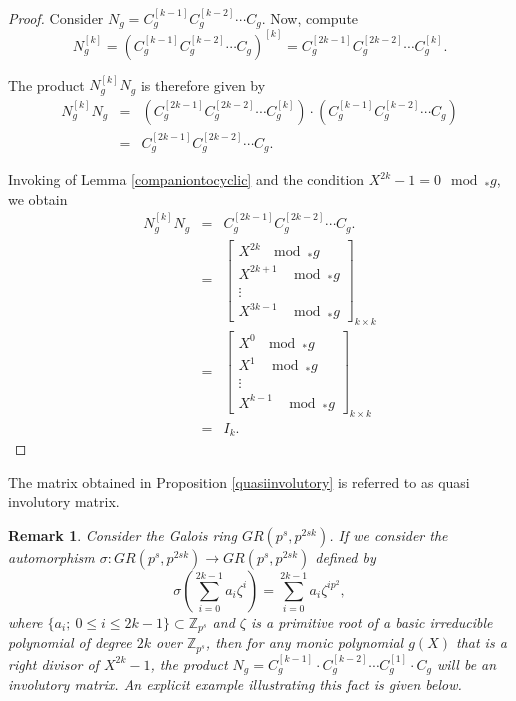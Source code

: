 \documentclass[11pt]{article}
\newtheorem{remark}{Remark}
\begin{document}
 
  \begin{proof} 
  	Consider $N_g = C_g^{[k-1]} C_g^{[k-2]} \cdots C_g$. Now, compute \[ N_g^{[k]} = (C_g^{[k-1]} C_g^{[k-2]} \cdots C_g)^{[k]} = C_g^{[2k-1]} C_g^{[2k-2]} \cdots C_g^{[k]}. \] 
    
    The product $N_g^{[k]}N_g$ is therefore given by 
    \begin{eqnarray*}
          N_g^{[k]}N_g &=& (C_g^{[2k-1]} C_g^{[2k-2]} \cdots C_g^{[k]}) \cdot (C_g^{[k-1]} C_g^{[k-2]} \cdots C_g)\\
          &=& C_g^{[2k-1]} C_g^{[2k-2]}   \cdots C_g. 
    \end{eqnarray*}
    
    Invoking of Lemma \ref{companiontocyclic} and the condition $X^{2k}-1=0 \mod_\ast g$, we obtain
    \begin{eqnarray*}
        N_g^{[k]}N_g&=&C_g^{[2k-1]} C_g^{[2k-2]}   \cdots C_g.\\
        &=&\begin{bmatrix}
		X^{2k}~ \mod _*g  \\
		X^{2k+1}~\ \mod _*g  \\
		\vdots\\
		X^{3k-1}~\ \mod _*g  
	\end{bmatrix}_{k\times k}\\
    &=&\begin{bmatrix}
		X^{0}~ \mod _*g  \\
		X^{1}~\ \mod _*g  \\
		\vdots\\
		X^{k-1}~\ \mod _*g  
	\end{bmatrix}_{k\times k}\\
    &=&I_k.
    \end{eqnarray*}
    \end{proof}
  		
The matrix obtained in Proposition \ref{quasiinvolutory} is referred to as quasi involutory matrix.



\begin{remark} 
    Consider the Galois ring $ GR(p^s, p^{2sk})$. If we consider the automorphism $\sigma: GR(p^s, p^{2sk}) \rightarrow GR(p^s, p^{2sk})$ defined by 
    \[ \sigma\left(\sum_{i=0}^{2k-1} a_i \zeta^i\right) = \sum_{i=0}^{2k-1} a_i \zeta^{i p^2}, \] 
    where $\{a_i;~ 0\leq i \leq 2k-1\} \subset \mathbb{Z}_{p^s}$ and $\zeta$ is a primitive root of a  basic irreducible polynomial  of degree $2k$ over $\mathbb{Z}_{p^s}$, then for any monic polynomial $g(X)$ that is a right divisor of $X^{2k}-1$, the product $N_g= C^{[k-1]}_g\cdot C^{[k-2]}_g\cdots C^{[1]}_g\cdot C_g$ will be an involutory matrix. An explicit example illustrating this fact is given below.
\end{remark}
\end{document}
